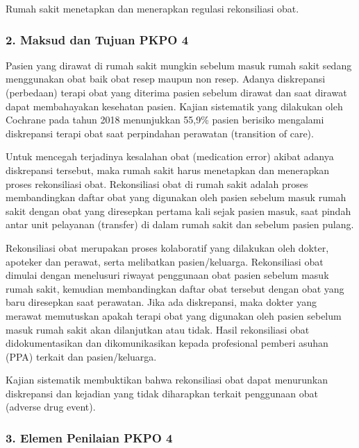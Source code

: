\documentclass[
]{book}
\begin{document}
Rumah sakit menetapkan dan menerapkan regulasi rekonsiliasi obat.

\hypertarget{maksud-dan-tujuan-pkpo-4}{%
\subsubsection*{2. Maksud dan Tujuan PKPO 4}\label{maksud-dan-tujuan-pkpo-4}}

Pasien yang dirawat di rumah sakit mungkin sebelum masuk rumah sakit sedang menggunakan obat baik obat resep maupun non resep. Adanya diskrepansi (perbedaan) terapi obat yang diterima pasien sebelum dirawat dan saat dirawat dapat membahayakan kesehatan pasien. Kajian sistematik yang dilakukan oleh Cochrane pada tahun 2018 menunjukkan 55,9\% pasien berisiko mengalami diskrepansi terapi obat saat perpindahan perawatan (transition of care).

Untuk mencegah terjadinya kesalahan obat (medication error) akibat adanya diskrepansi tersebut, maka rumah sakit harus menetapkan dan menerapkan proses rekonsiliasi obat. Rekonsiliasi obat di rumah sakit adalah proses membandingkan daftar obat yang digunakan oleh pasien sebelum masuk rumah sakit dengan obat yang diresepkan pertama kali sejak pasien masuk, saat pindah antar unit pelayanan (transfer) di dalam rumah sakit dan sebelum pasien pulang.

Rekonsiliasi obat merupakan proses kolaboratif yang dilakukan oleh dokter, apoteker dan perawat, serta melibatkan pasien/keluarga. Rekonsiliasi obat dimulai dengan menelusuri riwayat penggunaan obat pasien sebelum masuk rumah sakit, kemudian membandingkan daftar obat tersebut dengan obat yang baru diresepkan saat perawatan. Jika ada diskrepansi, maka dokter yang merawat memutuskan apakah terapi obat yang digunakan oleh pasien sebelum masuk rumah sakit akan dilanjutkan atau tidak. Hasil rekonsiliasi obat didokumentasikan dan dikomunikasikan kepada profesional pemberi asuhan (PPA) terkait dan pasien/keluarga.

Kajian sistematik membuktikan bahwa rekonsiliasi obat dapat menurunkan diskrepansi dan kejadian yang tidak diharapkan terkait penggunaan obat (adverse drug event).

\hypertarget{elemen-penilaian-pkpo-4}{%
\subsubsection*{3. Elemen Penilaian PKPO 4}\label{elemen-penilaian-pkpo-4}}
\end{document}
